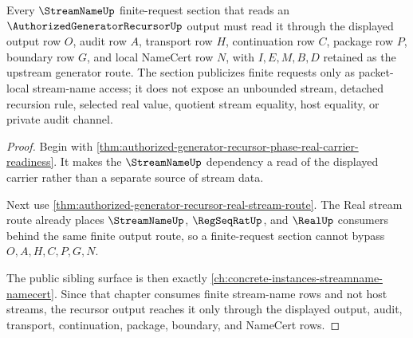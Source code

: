 \begin{theorem}
\label{thm:authorized-generator-recursor-streamname-finite-request-publicity}
Every $\StreamNameUp$ finite-request section that reads an $\AuthorizedGeneratorRecursorUp$ output must read it through the displayed output row $O$, audit row $A$, transport row $H$, continuation row $C$, package row $P$, boundary row $G$, and local NameCert row $N$, with $I,E,M,B,D$ retained as the upstream generator route. The section publicizes finite requests only as packet-local stream-name access; it does not expose an unbounded stream, detached recursion rule, selected real value, quotient stream equality, host equality, or private audit channel.
\end{theorem}
\begin{proof}
Begin with \autoref{thm:authorized-generator-recursor-phase-real-carrier-readiness}. It makes the $\StreamNameUp$ dependency a read of the displayed carrier rather than a separate source of stream data.

Next use \autoref{thm:authorized-generator-recursor-real-stream-route}. The Real stream route already places $\StreamNameUp$, $\RegSeqRatUp$, and $\RealUp$ consumers behind the same finite output route, so a finite-request section cannot bypass $O,A,H,C,P,G,N$.

The public sibling surface is then exactly \autoref{ch:concrete-instances-streamname-namecert}. Since that chapter consumes finite stream-name rows and not host streams, the recursor output reaches it only through the displayed output, audit, transport, continuation, package, boundary, and NameCert rows.
\end{proof}

